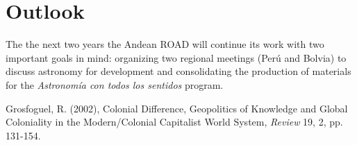 \documentclass{iau}
\begin{document}
\section{Outlook}
The the next two years the Andean ROAD will continue its work with two
important goals in mind: organizing two regional meetings (Per\'u
and Bolvia) to discuss astronomy for development and consolidating the
production of materials for the \emph{Astronom\'ia con todos los sentidos}
program. 

\begin{thebibliography}{}

{Grosfoguel, R. (2002)}, {Colonial Difference, Geopolitics of Knowledge
  and Global Coloniality 
  in the Modern/Colonial Capitalist World System}, 
\textit{Review} 19, 2, pp. 131-154.


\end{thebibliography}
\end{document}
